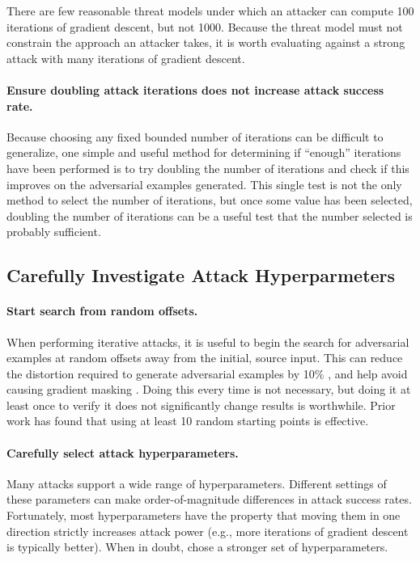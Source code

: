\documentclass{article} %
\begin{document}
There are few reasonable threat models under which an attacker can
compute 100 iterations of gradient descent, but not 1000.
%
Because the threat model must not constrain the approach an
attacker takes, it is worth evaluating against a strong attack
with many iterations of gradient descent.

\paragraph{Ensure doubling attack iterations does not increase attack success rate.}
%
Because choosing any fixed bounded number of iterations can be difficult to
generalize, one simple and useful method for determining if ``enough'' iterations
have been performed is to try doubling the number of iterations and check if this
improves on the adversarial examples generated.
%
This single test is not the only method to select the number of iterations,
but once some value has been selected, doubling the number of iterations
can be a useful test that the number selected is probably sufficient.



\subsection{Carefully Investigate Attack Hyperparmeters}
\label{sec:hyperparams}


\paragraph{Start search from random offsets.}
%
When performing iterative attacks,
it is useful to begin the search for adversarial examples at random
offsets away from the initial, source input.
%
This can reduce the
distortion required to generate adversarial examples by 10\%
\citep{carlini2017towards}, and help avoid causing gradient masking
\citep{tramer2017ensemble,madry2017towards}.
%
Doing this
every time is not necessary, but doing it at least once to verify it
does not significantly change results is worthwhile.
%
Prior work has found that using at least 10 random starting points is effective.

\paragraph{Carefully select attack hyperparameters.}
%
Many attacks support a wide range of hyperparameters.
%
Different settings of these parameters
can make order-of-magnitude differences in attack success rates.
%
Fortunately, most hyperparameters have the property that moving them in
one direction strictly increases attack power (e.g., more iterations of
gradient descent is typically better).
%
When in doubt, chose a stronger set of hyperparameters.
\end{document}
